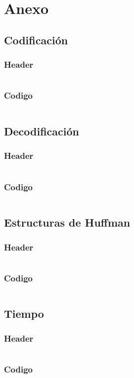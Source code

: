 \documentclass[12 pt]{report}
\begin{document}
\chapter{Anexo}
\section{Codificación}
\subsection{Header}
\inputminted{C}{../CompressHuffman.h}
\subsection{Codigo}

\inputminted{C}{../CompressHuffman.c}

\section{Decodificación}
\subsection{Header}
\inputminted{C}{../DecompressHuffman.h}
\subsection{Codigo}
\inputminted{C}{../DecompressHuffman.c}


\section{Estructuras de Huffman}
\subsection{Header}
\inputminted{C}{../HuffmanStructures.h}
\subsection{Codigo}
\inputminted{C}{../HuffmanStructures.c}


\section{Tiempo}
\subsection{Header}
\inputminted{C}{../tiempo.h}
\subsection{Codigo}
\inputminted{C}{../tiempo.c}
\end{document}
